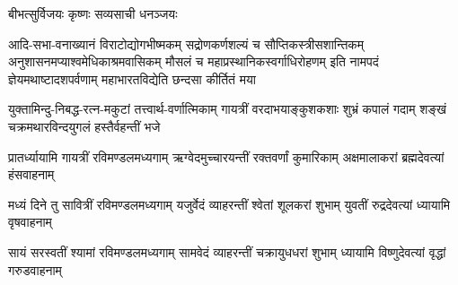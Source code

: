 \begin{center}

{बीभत्सुर्विजयः कृष्णः सव्यसाची धनञ्जयः}

\twolineshloka
{आदि-सभा-वनाख्यानं विराटोद्योगभीष्मकम्}
{सद्रोणकर्णशल्यं च सौप्तिकस्त्रीसशान्तिकम्}
\twolineshloka
{अनुशासनमप्याश्वमेधिकाश्रमवासिकम्}
{मौसलं च महाप्रस्थानिकस्वर्गाधिरोहणम्}
\twolineshloka
{इति नामपदं ज्ञेयमथाष्टादशपर्वणाम्}
{महाभारतविद्येति छन्दसा कीर्तितं मया}


{युक्तामिन्दु-निबद्ध-रत्न-मकुटां तत्त्वार्थ-वर्णात्मिकाम्}
{गायत्रीं वरदाभयाङ्कुशकशाः शुभ्रं कपालं गदाम्}
{शङ्खं चक्रमथारविन्दयुगलं हस्तैर्वहन्तीं भजे}

\threelineshloka
{प्रातर्ध्यायामि गायत्रीं रविमण्डलमध्यगाम्}
{ऋग्वेदमुच्चारयन्तीं रक्तवर्णां कुमारिकाम्}
{अक्षमालाकरां ब्रह्मदेवत्यां हंसवाहनाम्}

\threelineshloka
{मध्यं दिने तु सावित्रीं रविमण्डलमध्यगाम्}
{यजुर्वेदं व्याहरन्तीं श्वेतां शूलकरां शुभाम्}
{युवतीं रुद्रदेवत्यां ध्यायामि वृषवाहनाम्}

\threelineshloka
{सायं सरस्वतीं श्यामां रविमण्डलमध्यगाम्}
{सामवेदं व्याहरन्तीं चक्रायुधधरां शुभाम्}
{ध्यायामि विष्णुदेवत्यां वृद्धां गरुडवाहनाम्}







\end{center}
